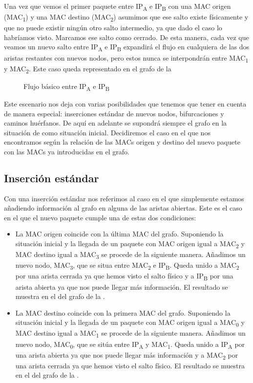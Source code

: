 \documentclass[twoside, 12pt]{epstfg}
\begin{document}
Una vez que vemos el primer paquete entre IP\textsubscript{A} e IP\textsubscript{B} con una MAC origen (MAC\textsubscript{1}) y una MAC destino (MAC\textsubscript{2}) asumimos que ese salto existe físicamente y que no puede existir ningún otro salto intermedio, ya que dado el caso lo habríamos visto. Marcamos ese salto como cerrado. De esta manera, cada vez que veamos un nuevo salto entre IP\textsubscript{A} e IP\textsubscript{B} expandirá el flujo en cualquiera de las dos aristas restantes con nuevos nodos, pero estos nunca se interpondrán entre MAC\textsubscript{1} y MAC\textsubscript{2}. Este caso queda representado en el grafo de la 

\begin{figure}
\centering

\caption[Flujo básico entre dos IPs]{Flujo básico entre IP\textsubscript{A} e IP\textsubscript{B}}
\label{fig:Analisis:BasicFlow}
\end{figure}

Este escenario nos deja con varias posibilidades que tenemos que tener en cuenta de manera especial: inserciones estándar de nuevos nodos, bifurcaciones y caminos huérfanos. De aquí en adelante se supondrá siempre el grafo en la situación de  como situación inicial. Decidiremos el caso en el que nos encontramos según la relación de las MACs origen y destino del nuevo paquete con las MACs ya introducidas en el grafo.

\subsection{Inserción estándar}
Con una inserción estándar nos referimos al caso en el que simplemente estamos añadiendo información al grafo en alguna de las aristas abiertas. Este es el caso en el que el nuevo paquete cumple una de estas dos condiciones:
\begin{itemize}
    \item La MAC origen coincide con la última MAC del grafo. Suponiendo la situación inicial y la llegada de un paquete con MAC origen igual a MAC\textsubscript{2} y MAC destino igual a MAC\textsubscript{3} se procede de la siguiente manera. Añadimos un nuevo nodo, MAC\textsubscript{3}, que se situa entre MAC\textsubscript{2} e IP\textsubscript{B}. Queda unido a  MAC\textsubscript{2} por una arista cerrada ya que hemos visto el salto físico y a IP\textsubscript{B} por una arista abierta ya que nos puede llegar más información. El resultado se muestra en el del grafo de la .
    \item La MAC destino coincide con la primera MAC del grafo. Suponiendo la situación inicial y la llegada de un paquete con MAC origen igual a MAC\textsubscript{0} y MAC destino igual a MAC\textsubscript{1} se procede de la siguiente manera. Añadimos un nuevo nodo, MAC\textsubscript{0}, que se sitúa entre IP\textsubscript{A} y MAC\textsubscript{1}. Queda unido a IP\textsubscript{A} por una arista abierta ya que nos puede llegar más información y a  MAC\textsubscript{2} por una arista cerrada ya que hemos visto el salto físico. El resultado se muestra en el del grafo de la .
\end{itemize}
\end{document}
